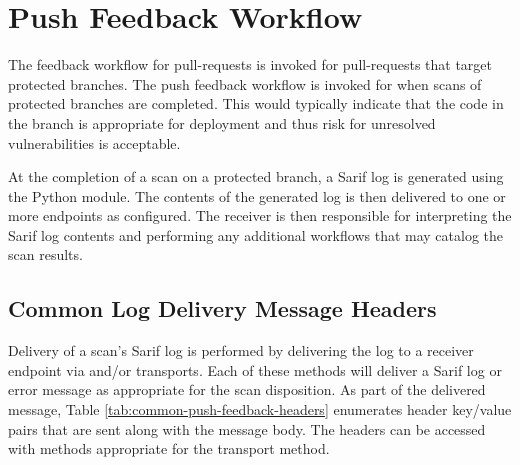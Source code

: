 \section{Push Feedback Workflow}\label{sec:push-workflow}

The feedback workflow for pull-requests is invoked for pull-requests that target
protected branches.  The push feedback workflow is invoked for when scans of protected
branches are completed.  This would typically indicate that the code in the branch
is appropriate for deployment and thus risk for unresolved vulnerabilities is acceptable.

At the completion of a scan on a protected branch, a Sarif log is generated using the
\cxonesarif Python module.  The contents of the generated log is then delivered to one
or more endpoints as configured.  The receiver is then responsible for interpreting the
Sarif log contents and performing any additional workflows that may catalog the
scan results.


\subsection{Common Log Delivery Message Headers}
Delivery of a scan's Sarif log is performed by delivering the log to a receiver
endpoint via  and/or 
transports.  Each of these methods will deliver a Sarif log or error message as appropriate for
the scan disposition.  As part of the delivered message, Table \ref{tab:common-push-feedback-headers}
enumerates header key/value pairs that are sent along with the message body.  The headers can be accessed
with methods appropriate for the transport method.

